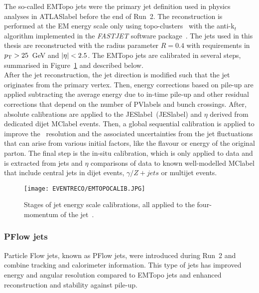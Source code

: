 The so-called EMTopo jets were the primary jet definition used in physics analyses in \acrshort{ATLASlabel} before the end of Run~2. The reconstruction is performed at the EM energy scale only using topo-clusters~\cite{PhysRevD.96.072002} with the anti-k$_t$ algorithm implemented in the \textit{FASTJET} software package~\cite{Cacciari2012}. The jets used in this thesis are reconstructed with the radius parameter $R = 0.4$ with requirements in $p_{\text{T}} > 25$~GeV and $\abs{\eta} < 2.5$. The EMTopo jets are calibrated in several steps, summarised in Figure~\ref{figEVNTRECO:EMTOPO} and described below.\\

After the jet reconstruction, the jet direction is modified such that the jet originates from the primary vertex. Then, energy corrections based on pile-up are applied subtracting the average energy due to in-time pile-up and other residual corrections that depend on the number of \acrshort{PVlabel}s and bunch crossings. After, absolute calibrations are applied to the \acrlong{JESlabel}~(\acrshort{JESlabel}) and $\eta$ derived from dedicated dijet \acrshort{MClabel} events. Then, a global sequential calibration is applied to improve the \pT\ resolution and the associated uncertainties from the jet fluctuations that can arise from various initial factors, like the flavour or energy of the original parton. The final step is the in-situ calibration, which is only applied to data and is extracted from jets \pT and $\eta$ comparisons of data to known well-modelled \acrshort{MClabel} that include central jets in dijet events, $\gamma/Z+jets$ or multijet events.\\

\begin{figure}[htbp]
    \RawFloats
    \begin{center}
    \texttt{[image: EVENTRECO/EMTOPOCALIB.JPG]}
    \caption{
        Stages of jet energy scale calibrations, all applied to the four-momentum of the jet~\cite{ATLAS_Collaboration2020-ip}. 
    }
    \label{figEVNTRECO:EMTOPO}
    \end{center}
\end{figure}
\subsubsection{PFlow jets}

Particle Flow jets, known as PFlow jets, were introduced during Run~2 and combine tracking and calorimeter information. This type of jets has improved energy and angular resolution compared to EMTopo jets and enhanced reconstruction and stability against pile-up.\\

